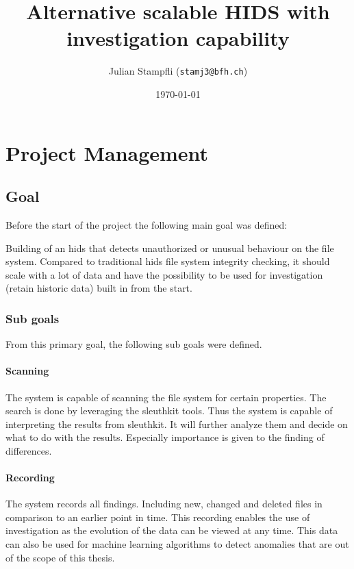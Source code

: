 \documentclass[
	a4paper,					%
	10pt,							%
	twoside,					%
	openright,				%
	notitlepage,			%
	parskip=half,			%
]{scrreprt}					%
\begin{document}
\title{Alternative scalable HIDS with investigation capability}
\date{\today} 
\author{ Julian Stampfli (\texttt{stamj3@bfh.ch}) }
\maketitle
\setcounter{tocdepth}{2}
\tableofcontents
\clearpage

\chapter{Project Management}

\section{Goal}
\label{apdx-sec:goal}
Before the start of the project the following main goal was defined:

Building of an \gls{hids} that detects unauthorized or unusual behaviour on the file system. Compared to traditional \gls{hids} file system integrity checking, it should scale with a lot of data and have the possibility to be used for investigation (retain historic data) built in from the start.

\subsection{Sub goals}

From this primary goal, the following sub goals were defined. 

\subsubsection{Scanning}
The system is capable of scanning the file system for certain properties. The search is done by leveraging the sleuthkit tools. Thus the system is capable of interpreting the results from sleuthkit. It will further analyze them and decide on what to do with the results. Especially importance is given to the finding of differences.

\subsubsection{Recording}
The system records all findings. Including new, changed and deleted files in comparison to an earlier point in time. This recording enables the use of investigation as the evolution of the data can be viewed at any time. This data can also be used for machine learning algorithms to detect anomalies that are out of the scope of this thesis. 
\end{document}
